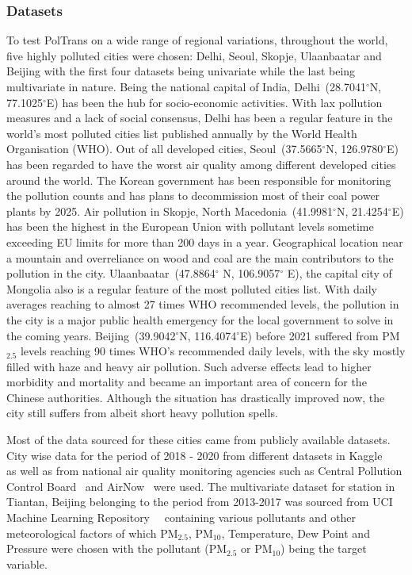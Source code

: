 \documentclass[10pt,journal]{IEEEtran}
\begin{document}
\subsubsection{Datasets}
To test {PolTrans} on a wide range of regional variations, throughout the world, five highly polluted cities were chosen: Delhi, Seoul, Skopje, Ulaanbaatar and Beijing with the first four datasets being univariate while the last being multivariate in nature. Being the national capital of India, Delhi~(28.7041${^{\circ}}$N, 77.1025${^{\circ}}$E) has been the hub for socio-economic activities. With lax pollution measures and a lack of social consensus, Delhi has been a regular feature in the world's most polluted cities list published annually by the World Health Organisation (WHO). Out of all developed cities, Seoul~(37.5665${^{\circ}}$N, 126.9780${^{\circ}}$E) has been regarded to have the worst air quality among different developed cities around the world. The Korean government has been responsible for monitoring the pollution counts and has plans to decommission most of their coal power plants by 2025. Air pollution in Skopje, North Macedonia~(41.9981${^{\circ}}$N, 21.4254${^{\circ}}$E) has been the highest in the European Union with pollutant levels sometime exceeding EU limits for more than 200 days in a year. Geographical location near a mountain and overreliance on wood and coal are the main contributors to the pollution in the city. Ulaanbaatar~(47.8864${^{\circ}}$ N, 106.9057${^{\circ}}$ E), the capital city of Mongolia also is a regular feature of the most polluted cities list. With daily averages reaching to almost 27 times WHO recommended levels, the pollution in the city is a major public health emergency for the local government to solve in the coming years. Beijing~(39.9042${^{\circ}}$N, 116.4074${^{\circ}}$E) before 2021 suffered from PM${_{2.5}}$ levels reaching 90 times WHO's recommended daily levels, with the sky mostly filled with haze and heavy air pollution. Such adverse effects lead to higher morbidity and mortality and became an important area of concern for the Chinese authorities. Although the situation has drastically improved now, the city still suffers from albeit short heavy pollution spells.

Most of the data sourced for these cities came from publicly available datasets. City wise data for the period of 2018 - 2020 from different datasets in Kaggle~\cite{Kaggle.Delhi}~\cite{Kaggle.Seoul}~\cite{Kaggle.Skopje}~\cite{Kaggle.Ulaanbaatar} as well as from national air quality monitoring agencies such as Central Pollution Control Board~\cite{CPCB} and AirNow~\cite{AirNow} were used. The multivariate dataset for station in Tiantan, Beijing belonging to the period from 2013-2017 was sourced from UCI Machine Learning Repository~\cite{UCI.2017}~\cite{Zhang.2017} containing various pollutants and other meteorological factors of which PM${_{2.5}}$, PM${_{10}}$, Temperature, Dew Point and Pressure were chosen with the pollutant (PM${_{2.5}}$ or PM${_{10}}$) being the target variable.
\end{document}
